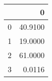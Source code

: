 \begin{tabular}{lr}
\toprule
{} &        0 \\
\midrule
0 &  40.9100 \\
1 &  19.0000 \\
2 &  61.0000 \\
3 &   0.0116 \\
\bottomrule
\end{tabular}
